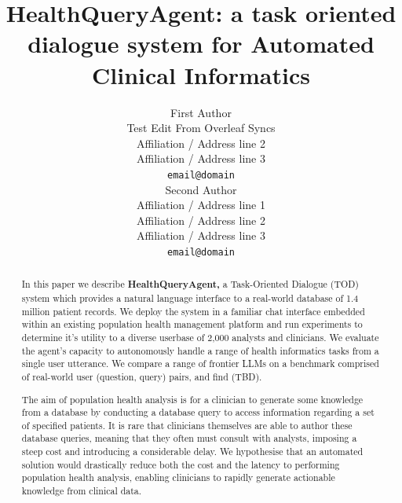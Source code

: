 \documentclass[11pt]{article}
\title{HealthQueryAgent: a task oriented dialogue system for Automated Clinical Informatics}
\author{First Author \\
  Test Edit From Overleaf Syncs \\
  Affiliation / Address line 2 \\
  Affiliation / Address line 3 \\
  \texttt{email@domain} \\\And
  Second Author \\
  Affiliation / Address line 1 \\
  Affiliation / Address line 2 \\
  Affiliation / Address line 3 \\
  \texttt{email@domain} \\}
\begin{document}
\maketitle
\begin{abstract}

In this paper we describe \textbf{HealthQueryAgent,} a Task-Oriented Dialogue (TOD) system which provides a natural language interface to a real-world database of 1.4 million patient records. We deploy the system in a familiar chat interface embedded within an existing population health management platform and run experiments to determine it's utility to a diverse userbase of 2,000 analysts and clinicians. We evaluate the agent's capacity to autonomously handle a range of health informatics tasks from a single user utterance. We compare a range of frontier LLMs on a benchmark comprised of real-world user (question, query) pairs, and find (TBD).

The aim of population health analysis is for a clinician to generate some knowledge from a database by conducting a database query to access information regarding a set of specified patients. 
It is rare that clinicians themselves are able to author these database queries, meaning that they often must consult with analysts, imposing a steep cost and introducing a considerable delay. We hypothesise that an automated solution would drastically reduce both the cost and the latency to performing population health analysis, enabling clinicians to rapidly generate actionable knowledge from clinical data.

\end{abstract}
\end{document}
